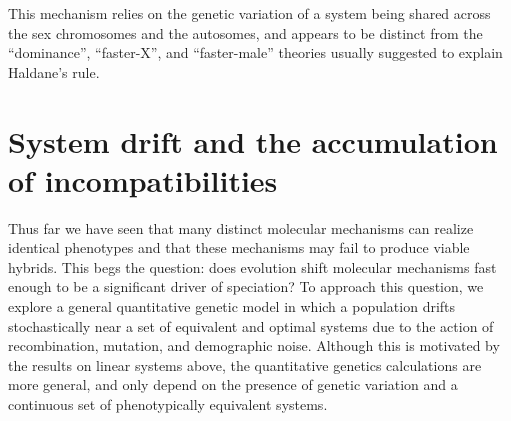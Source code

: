 \documentclass{article}
\newcommand{\plr}[1]{\todo[color=blue!25]{#1}}
\newcommand{\plr}[1]{{\color{blue}\it #1}}
\newcommand{\1}{\mathbbm{1}}
\begin{document}
This mechanism relies on the genetic variation of a system being shared across the sex chromosomes and the autosomes,
and appears to be distinct from the ``dominance'', ``faster-X'', and ``faster-male'' theories \citep{orr1997haldane, coyne1998evolutionary, turelli1995dominance} usually suggested to explain Haldane's rule.

\section*{System drift and the accumulation of incompatibilities}

Thus far we have seen that many distinct molecular mechanisms can realize identical phenotypes
and that these mechanisms may fail to produce viable hybrids.
This begs the question: does evolution shift molecular mechanisms
fast enough to be a significant driver of speciation?
To approach this question,
we explore a general quantitative genetic model in which a population drifts stochastically
near a set of equivalent and optimal systems
due to the action of recombination, mutation, and demographic noise.
Although this is motivated by the results on linear systems above,
the quantitative genetics calculations are more general,
and only depend on the presence of genetic variation and a continuous set of phenotypically equivalent systems.
\end{document}
